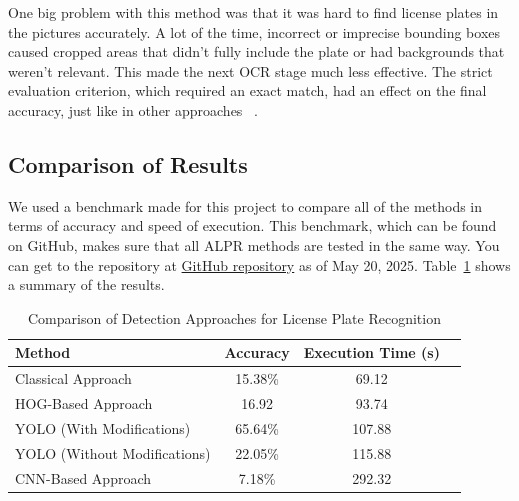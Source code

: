 \documentclass[runningheads]{llncs}
\begin{document}
One big problem with this method was that it was hard to find license plates in the pictures accurately. A lot of the time, incorrect or imprecise bounding boxes caused cropped areas that didn't fully include the plate or had backgrounds that weren't relevant. This made the next OCR stage much less effective. The strict evaluation criterion, which required an exact match, had an effect on the final accuracy, just like in other approaches ~\cite{githubGitHubArtisan1218AutomaticLicensePlateReader}. 


\subsection{Comparison of Results}
We used a benchmark made for this project to compare all of the methods in terms of accuracy and speed of execution. This benchmark, which can be found on GitHub, makes sure that all ALPR methods are tested in the same way. You can get to the repository at \href{https://github.com/WojteGK/license-plate-recognition-benchmark}{GitHub repository} as of May 20, 2025. Table~\ref{tab:results} shows a summary of the results.


\begin{table}[ht]
    \centering
    \caption{Comparison of Detection Approaches for License Plate Recognition}
    \label{tab:results}
        \begin{tabular}{|l|c|c|c|}
        \hline
        \textbf{Method} & \textbf{Accuracy} & \textbf{Execution Time (s)} \\
        \hline
        Classical Approach & 15.38\% & 69.12 \\
        \hline
        HOG-Based Approach & 16.92 & 93.74 \\
        \hline
        YOLO (With Modifications) & 65.64\% & 107.88 \\
        \hline
        YOLO (Without Modifications) & 22.05\% & 115.88 \\
        \hline
        CNN-Based Approach & 7.18\% & 292.32 \\
        \hline
        \end{tabular}
\end{table}
\end{document}
